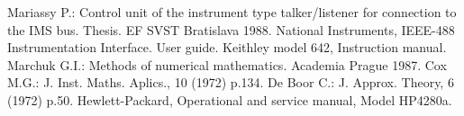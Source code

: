 \begin{thebibliography}{}
 Mariassy P.: Control unit of the instrument type
  talker/listener for connection to the IMS bus. Thesis. EF SVST
  Bratislava 1988.
 National Instruments, IEEE-488 Instrumentation
  Interface. User guide.
 Keithley model 642, Instruction manual.
 Marchuk G.I.: Methods of numerical
  mathematics. Academia Prague 1987.
 Cox M.G.: J. Inst. Maths. Aplics., 10 (1972) p.134.
 De Boor C.: J. Approx. Theory, 6 (1972) p.50.
 Hewlett-Packard, Operational and service manual,
  Model HP4280a.
\end{thebibliography}
